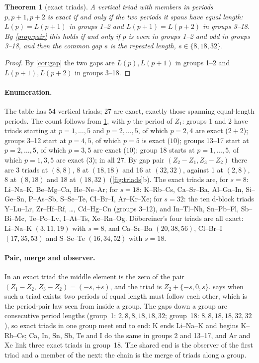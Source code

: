\documentclass[11pt]{article}
\newtheorem{theorem}{Theorem}
\theoremstyle{definition}\newtheorem{definition}[theorem]{Definition}
\theoremstyle{remark}\newtheorem{remark}[theorem]{Remark}
\begin{document}
\begin{theorem}[exact triads]\label{thm:exact}
A vertical triad with members in periods $p,p+1,p+2$ is exact if and only if the two periods it spans have equal length: $L(p)=L(p+1)$ in groups 1--2 and $L(p+1)=L(p+2)$ in groups 3--18. By \cref{prop:pair} this holds if and only if $p$ is even in groups 1--2 and odd in groups 3--18, and then the common gap $s$ is the repeated length, $s\in\{8,18,32\}$.
\end{theorem}
\begin{proof}
By \cref{cor:gap} the two gaps are $L(p),L(p+1)$ in groups 1--2 and $L(p+1),L(p+2)$ in groups 3--18.
\end{proof}

\paragraph{Enumeration.} The table has 54 vertical triads; 27 are exact, exactly those spanning equal-length periods. The count follows from \cref{thm:exact}, with $p$ the period of $Z_1$: groups 1 and 2 have triads starting at $p=1,\dots,5$ and $p=2,\dots,5$, of which $p=2,4$ are exact ($2+2$); groups 3--12 start at $p=4,5$, of which $p=5$ is exact ($10$); groups 13--17 start at $p=2,\dots,5$, of which $p=3,5$ are exact ($10$); group 18 starts at $p=1,\dots,5$, of which $p=1,3,5$ are exact ($3$); in all $27$. By gap pair $(Z_2-Z_1,Z_3-Z_2)$ there are 3 triads at $(8,8)$, 8 at $(18,18)$ and 16 at $(32,32)$, against 1 at $(2,8)$, 8 at $(8,18)$ and 18 at $(18,32)$ (\cref{fig:triads}b). The exact triads are, for $s=8$: Li--Na--K, Be--Mg--Ca, He--Ne--Ar; for $s=18$: K--Rb--Cs, Ca--Sr--Ba, Al--Ga--In, Si--Ge--Sn, P--As--Sb, S--Se--Te, Cl--Br--I, Ar--Kr--Xe; for $s=32$: the ten d-block triads Y--Lu--Lr, Zr--Hf--Rf, \dots, Cd--Hg--Cn (groups 3--12), and In--Tl--Nh, Sn--Pb--Fl, Sb--Bi--Mc, Te--Po--Lv, I--At--Ts, Xe--Rn--Og.
D\"obereiner's four triads are all exact: Li--Na--K $(3,11,19)$ with $s=8$, and Ca--Sr--Ba $(20,38,56)$, Cl--Br--I $(17,35,53)$ and S--Se--Te $(16,34,52)$ with $s=18$.

\paragraph{Pair, merge and observer.} In an exact triad the middle element is the zero of the pair $(Z_1-Z_2,\,Z_3-Z_2)=(-s,+s)$, and the triad is $Z_2+\{-s,0,s\}$.  says when such a triad exists: two periods of equal length must follow each other, which is the period-pair law seen from inside a group. The gaps down a group are consecutive period lengths (group~1: $2,8,8,18,18,32$; group~18: $8,8,18,18,32,32$), so exact triads in one group meet end to end: K ends Li--Na--K and begins K--Rb--Cs; Ca, In, Sn, Sb, Te and I do the same in groups 2 and 13--17, and Ar and Xe link three exact triads in group~18. The shared end is the observer of the first triad and a member of the next: the chain is the merge of triads along a group.
\end{document}
